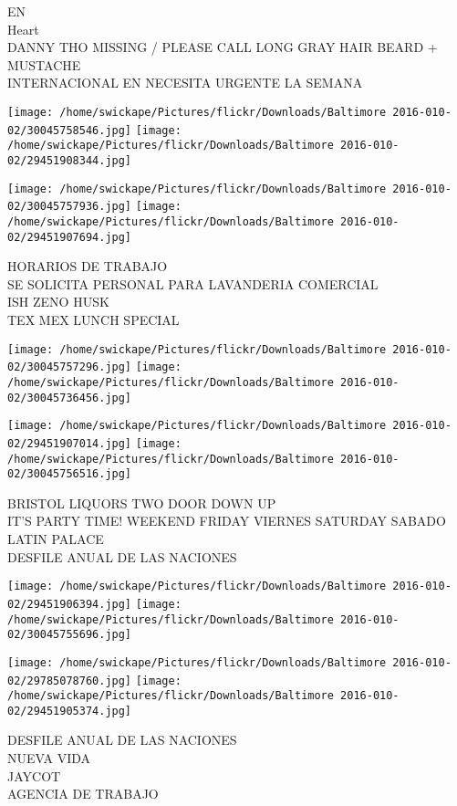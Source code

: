 \documentclass[10pt,letterpaper]{article}
\begin{document}
EN\\
Heart\\
DANNY THO MISSING / PLEASE CALL LONG GRAY HAIR BEARD + MUSTACHE\\
INTERNACIONAL EN NECESITA URGENTE LA SEMANA
\pagebreak

\texttt{[image: /home/swickape/Pictures/flickr/Downloads/Baltimore 2016-010-02/30045758546.jpg]}
\texttt{[image: /home/swickape/Pictures/flickr/Downloads/Baltimore 2016-010-02/29451908344.jpg]}

\texttt{[image: /home/swickape/Pictures/flickr/Downloads/Baltimore 2016-010-02/30045757936.jpg]}
\texttt{[image: /home/swickape/Pictures/flickr/Downloads/Baltimore 2016-010-02/29451907694.jpg]}

HORARIOS DE TRABAJO\\
SE SOLICITA PERSONAL PARA LAVANDERIA COMERCIAL\\
ISH ZENO HUSK\\
TEX MEX LUNCH SPECIAL
\pagebreak

\texttt{[image: /home/swickape/Pictures/flickr/Downloads/Baltimore 2016-010-02/30045757296.jpg]}
\texttt{[image: /home/swickape/Pictures/flickr/Downloads/Baltimore 2016-010-02/30045736456.jpg]}

\texttt{[image: /home/swickape/Pictures/flickr/Downloads/Baltimore 2016-010-02/29451907014.jpg]}
\texttt{[image: /home/swickape/Pictures/flickr/Downloads/Baltimore 2016-010-02/30045756516.jpg]}

BRISTOL LIQUORS TWO DOOR DOWN UP\\
IT'S PARTY TIME!  WEEKEND FRIDAY VIERNES SATURDAY SABADO\\
LATIN PALACE\\
DESFILE ANUAL DE LAS NACIONES
\pagebreak

\texttt{[image: /home/swickape/Pictures/flickr/Downloads/Baltimore 2016-010-02/29451906394.jpg]}
\texttt{[image: /home/swickape/Pictures/flickr/Downloads/Baltimore 2016-010-02/30045755696.jpg]}

\texttt{[image: /home/swickape/Pictures/flickr/Downloads/Baltimore 2016-010-02/29785078760.jpg]}
\texttt{[image: /home/swickape/Pictures/flickr/Downloads/Baltimore 2016-010-02/29451905374.jpg]}

DESFILE ANUAL DE LAS NACIONES\\
NUEVA VIDA\\
JAYCOT\\
AGENCIA DE TRABAJO
\pagebreak
\end{document}
